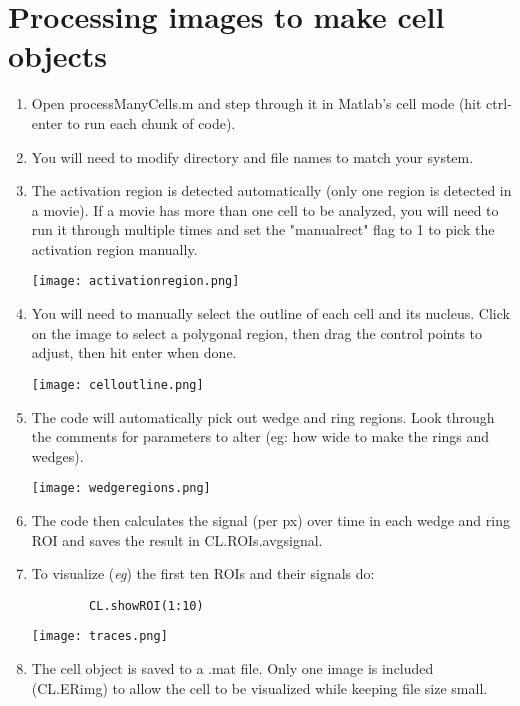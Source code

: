 \documentclass[12pt]{article}
\begin{document}
\section{Processing images to make cell objects}
\label{sec:processcells}
	\begin{enumerate}
		\item Open processManyCells.m and step through it in Matlab's cell mode (hit ctrl-enter to run each chunk of code).		
		\item You will need to modify directory and file names to match your system. 
		\item The activation region is detected automatically (only one region is detected in a movie). If a movie has more than one cell to be analyzed, you will need to run it through multiple times and set the "manualrect" flag to 1 to pick the activation region manually.
		
		\centerline{\texttt{[image: activationregion.png]}}
		
		\item You will need to manually select the outline of each cell and its nucleus.  Click on the image to select a polygonal region, then drag the control points to adjust, then hit enter when done.
		
		\centerline{\texttt{[image: celloutline.png]}}
		
		\item The code will automatically pick out wedge and ring regions. Look through the comments for parameters to alter (eg: how wide to make the rings and wedges).
		
		\centerline{\texttt{[image: wedgeregions.png]}}
		
		\item The code then calculates the signal (per px) over time in each wedge and ring ROI and saves the result in CL.ROIs.avgsignal. 
		
		\item To visualize ({\em eg}) the first ten ROIs and their signals do:
		\begin{verbatim}
		CL.showROI(1:10)
		\end{verbatim}
		
		\centerline{\texttt{[image: traces.png]}}
		
		\item The cell object is saved to a .mat file. Only one image is included (CL.ERimg) to allow the cell to be visualized while keeping file size small.		
	\end{enumerate}	
	
\end{document}
